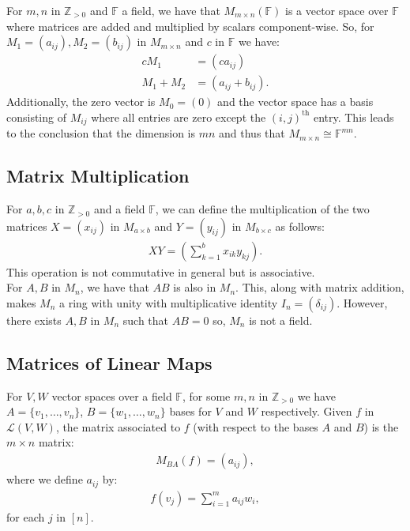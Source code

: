 \documentclass[a4paper, 12pt, twoside]{article}
\begin{document}
For $m, n$ in $\mathbb{Z}_{>0}$ and $\mathbb{F}$ a field, we have
that $M_{m \times n}(\mathbb{F})$ is a vector space over $\mathbb{F}$
where matrices are added and multiplied by scalars component-wise.
So, for \newline $M_1 = (a_{ij}), M_2 = (b_{ij})$ in $M_{m\times n}$
and $c$ in $\mathbb{F}$ we have:
\begin{align*}
  cM_1 &= (ca_{ij}) \\
  M_1 + M_2 &= (a_{ij} + b_{ij}).
\end{align*} Additionally, the zero vector is $M_0 = (0)$ and the vector
space has a basis consisting of $M_{ij}$ where all entries are zero
except the $(i, j)^{\text{th}}$ entry. This leads to the conclusion
that the dimension is $mn$ and thus that 
$M_{m \times n} \cong \mathbb{F}^{mn}$.

\subsection{Matrix Multiplication}

For $a, b, c$ in $\mathbb{Z}_{>0}$ and a field $\mathbb{F}$, 
we can define the multiplication of the two matrices $X = (x_{ij})$ in
$M_{a \times b}$ and $Y = (y_{ij})$ in $M_{b \times c}$ as follows: 
\begin{gather*}
  XY = (\sum_{k = 1}^b x_{ik}y_{kj}).
\end{gather*} This operation is not commutative in general but is
associative.
\\[\baselineskip]
For $A, B$ in $M_n$, we have that $AB$ is also in $M_n$. This,
along with matrix addition, makes $M_n$ a ring with unity with
multiplicative identity $I_n = (\delta_{ij})$. However, there exists
$A, B$ in $M_n$ such that $AB=0$ so, $M_n$ is not a field.

\subsection{Matrices of Linear Maps}

For $V, W$ vector spaces over a field $\mathbb{F}$, for some
$m, n$ in $\mathbb{Z}_{>0}$ we have $A = \{v_1, \ldots, v_n\}$,
$B = \{w_1, \ldots, w_n\}$ bases for $V$ and $W$ respectively.
Given $f$ in $\mathcal{L}(V, W)$, the matrix associated to $f$
(with respect to the bases $A$ and $B$) is the $m \times n$ matrix:
\begin{gather*}
  M_{BA}(f) = (a_{ij}),
\end{gather*} where we define $a_{ij}$ by: \begin{gather*}
  f(v_j) = \sum_{i = 1}^m a_{ij}w_i,
\end{gather*} for each $j$ in $[n]$.
\end{document}
